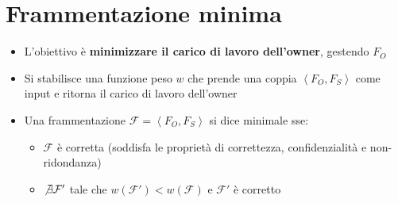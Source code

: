 \documentclass{report}
\begin{document}
\newpage
\section{Frammentazione minima}
\begin{itemize}
    \item L'obiettivo è \textbf{minimizzare il carico di lavoro dell'owner}, gestendo $F_O$
    \item Si stabilisce una funzione peso $w$ che prende una coppia $\left\langle F_O, F_S \right\rangle$ come input
    e ritorna il carico di lavoro dell'owner 
    \item Una frammentazione $\mathcal{F} = \left\langle F_O, F_S \right\rangle$ si dice minimale sse:
    \begin{itemize}
        \item $\mathcal{F}$ è corretta (soddisfa le proprietà di correttezza, confidenzialità e non-ridondanza)
        \item $ \not\exists \mathcal{F}'$ tale che $w(\mathcal{F}') < w(\mathcal{F})$ e $\mathcal{F}'$ è corretto 
    \end{itemize}
\end{itemize}
\end{document}

